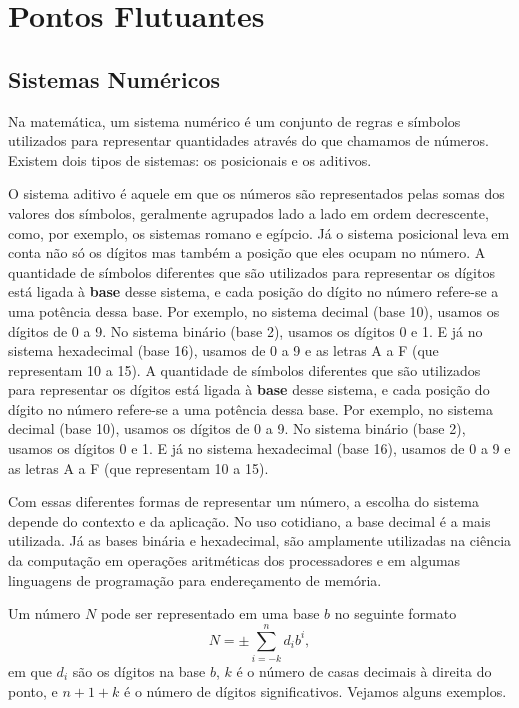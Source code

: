 \chapter{Pontos Flutuantes}
\label{chap:floatingpoints}

\section{Sistemas Numéricos}
Na matemática, um sistema numérico é um conjunto de regras e símbolos utilizados para representar quantidades através do que chamamos de números. Existem dois tipos de sistemas: os posicionais e os aditivos.

O sistema aditivo é aquele em que os números são representados pelas somas dos valores dos símbolos, geralmente agrupados lado a lado em ordem decrescente, como, por exemplo, os sistemas romano e egípcio. Já o sistema posicional leva em conta não só os dígitos mas também a posição que eles ocupam no número. A quantidade de símbolos diferentes que são utilizados para representar os dígitos está ligada à \textbf{base} desse sistema, e cada posição do dígito no número refere-se a uma potência dessa base. Por exemplo, no sistema decimal (base 10), usamos os dígitos de 0 a 9. No sistema binário (base 2), usamos os dígitos 0 e 1. E já no sistema hexadecimal (base 16), usamos de 0 a 9 e as letras A a F (que representam 10 a 15).
A quantidade de símbolos diferentes que são utilizados para representar os dígitos está ligada à \textbf{base} desse sistema, e cada posição do dígito no número refere-se a uma potência dessa base. Por exemplo, no sistema decimal (base 10), usamos os dígitos de 0 a 9. No sistema binário (base 2), usamos os dígitos 0 e 1. E já no sistema hexadecimal (base 16), usamos de 0 a 9 e as letras A a F (que representam 10 a 15).

Com essas diferentes formas de representar um número, a escolha do sistema depende do contexto e da aplicação. No uso cotidiano, a base decimal é a mais utilizada. Já as bases binária e hexadecimal, são amplamente utilizadas na ciência da computação em operações aritméticas dos processadores e em algumas linguagens de programação para endereçamento de memória.

Um número $N$ pode ser representado em uma base \(b\) no seguinte formato
\begin{equation}
N = \pm \sum_{i=-k}^{n} d_i b^i,
\end{equation}
em que \(d_i\) são os dígitos na base \(b\), \(k\) é o número de casas decimais à direita do ponto, e \(n+1+k\) é o número de dígitos significativos. Vejamos alguns exemplos.

